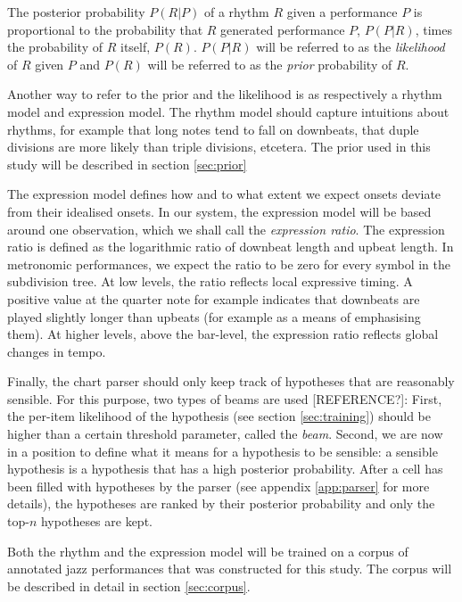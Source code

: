 The posterior probability $P(R|P)$ of a rhythm $R$ given a performance $P$ is proportional to the probability that $R$ generated performance $P$, $P(P|R)$, times the probability of $R$ itself, $P(R)$. $P(P|R)$ will be referred to as the \textit{likelihood} of $R$ given $P$ and $P(R)$ will be referred to as the \textit{prior} probability of $R$.

Another way to refer to the prior and the likelihood is as respectively a rhythm model and expression model. The rhythm model should capture intuitions about rhythms, for example that long notes tend to fall on downbeats, that duple divisions are more likely than triple divisions, etcetera. The prior used in this study will be described in section \ref{sec:prior}

The expression model defines how and to what extent we expect onsets deviate from their idealised onsets. In our system, the expression model will be based around one observation, which we shall call the \textit{expression ratio}. The expression ratio is defined as the logarithmic ratio of downbeat length and upbeat length. In metronomic performances, we expect the ratio to be zero for every symbol in the subdivision tree. At low levels, the ratio reflects local expressive timing. A positive value at the quarter note for example indicates that downbeats are played slightly longer than upbeats (for example as a means of emphasising them). At higher levels, above the bar-level, the expression ratio reflects global changes in tempo.


Finally, the chart parser should only keep track of hypotheses that are reasonably sensible. For this purpose, two types of beams are used [REFERENCE?]: First, the per-item likelihood of the hypothesis (see section \ref{sec:training}) should be higher than a certain threshold parameter, called the \textit{beam}. Second, we are now in a position to define what it means for a hypothesis to be sensible: a sensible hypothesis is a hypothesis that has a high posterior probability. After a cell has been filled with hypotheses by the parser (see appendix \ref{app:parser} for more details), the hypotheses are ranked by their posterior probability and only the top-$n$ hypotheses are kept.

Both the rhythm and the expression model will be trained on a corpus of annotated jazz performances that was constructed for this study. The corpus will be described in detail in section \ref{sec:corpus}.

